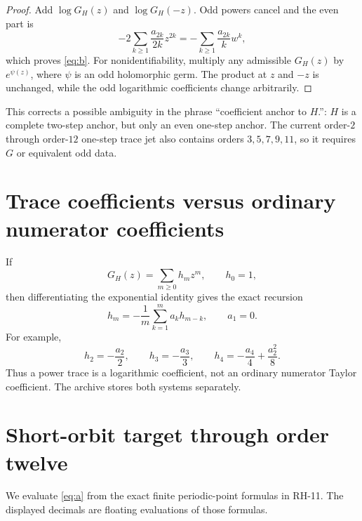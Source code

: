 \documentclass[11pt]{article}
\theoremstyle{remark}
\begin{document}
\begin{proof}
Add $\log G_H(z)$ and $\log G_H(-z)$.  Odd powers cancel and the even part is
\[
 -2\sum_{k\ge1}\frac{a_{2k}}{2k}z^{2k}
 =-\sum_{k\ge1}\frac{a_{2k}}{k}w^k,
\]
which proves \eqref{eq:b}.  For nonidentifiability, multiply any admissible
$G_H(z)$ by $e^{\psi(z)}$, where $\psi$ is an odd holomorphic germ.  The
product at $z$ and $-z$ is unchanged, while the odd logarithmic coefficients
change arbitrarily.
\end{proof}

This corrects a possible ambiguity in the phrase ``coefficient anchor to
$H$.'': $H$ is a complete two-step anchor, but only an even one-step anchor.
The current order-$2$ through order-$12$ one-step trace jet also contains
orders $3,5,7,9,11$, so it requires $G$ or equivalent odd data.

\section{Trace coefficients versus ordinary numerator coefficients}

If
\[
 G_H(z)=\sum_{m\ge0}h_mz^m,
 \qquad h_0=1,
\]
then differentiating the exponential identity gives the exact recursion
\begin{equation}\label{eq:recursion}
 h_m=-\frac1m\sum_{k=1}^m a_k h_{m-k},
 \qquad a_1=0.
\end{equation}
For example,
\[
 h_2=-\frac{a_2}{2},\qquad
 h_3=-\frac{a_3}{3},\qquad
 h_4=-\frac{a_4}{4}+\frac{a_2^2}{8}.
\]
Thus a power trace is a logarithmic coefficient, not an ordinary numerator
Taylor coefficient.  The archive stores both systems separately.

\section{Short-orbit target through order twelve}

We evaluate \eqref{eq:a} from the exact finite periodic-point formulas in
RH-11.  The displayed decimals are floating evaluations of those formulas.
\end{document}
